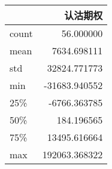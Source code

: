 \begin{tabular}{lr}
\toprule
{} &              认沽期权 \\
\midrule
count &      56.000000 \\
mean  &    7634.698111 \\
std   &   32824.771773 \\
min   &  -31683.940552 \\
25\%   &   -6766.363785 \\
50\%   &     184.196565 \\
75\%   &   13495.616664 \\
max   &  192063.368322 \\
\bottomrule
\end{tabular}
